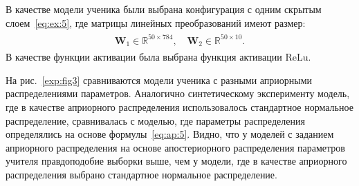 \documentclass[12pt]{a&t}
\begin{document}
В качестве модели ученика были выбрана конфигурация с одним скрытым слоем~\eqref{eq:ex:5}, где матрицы линейных преобразований имеют размер:
\begin{gather}
\label{eq:ex:7}
\begin{aligned}
\mathbf{W}_{1} \in \mathbb{R}^{50 \times 784}, \quad \mathbf{W}_{2} \in \mathbb{R}^{50 \times 10}.
\end{aligned}
\end{gather}
В качестве функции активации была выбрана функция активации $\text{ReLu}$.

На рис.~\ref{exp:fig3} сравниваются модели ученика с разными априорными распределениями параметров.
Аналогично синтетическому эксперименту модель, где в качестве априорного распределения использовалось стандартное нормальное распределение, сравнивалась с моделью, где параметры распределения определялись на основе формулы~\eqref{eq:ap:5}.
Видно, что у моделей с заданием априорного распределения на основе апостериорного распределения параметров учителя правдоподобие выборки выше, чем у модели, где в качестве априорного распределения выбрано стандартное нормальное распределение.
\end{document}
